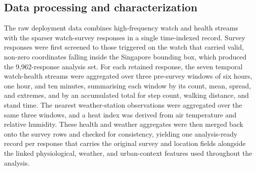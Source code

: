 \documentclass[]{interact}
\begin{document}

\subsection{Data processing and characterization}\label{sec:methods-eda}


The raw deployment data combines high-frequency watch and health streams with the sparser watch-survey responses in a single time-indexed record.
Survey responses were first screened to those triggered on the watch that carried valid, non-zero coordinates falling inside the Singapore bounding box, which produced the 9{,}962-response analysis set.
For each retained response, the seven temporal watch-health streams were aggregated over three pre-survey windows of six hours, one hour, and ten minutes, summarising each window by its count, mean, spread, and extremes, and by an accumulated total for step count, walking distance, and stand time.
The nearest weather-station observations were aggregated over the same three windows, and a heat index was derived from air temperature and relative humidity.
These health and weather aggregates were then merged back onto the survey rows and checked for consistency, yielding one analysis-ready record per response that carries the original survey and location fields alongside the linked physiological, weather, and urban-context features used throughout the analysis.


\end{document}
